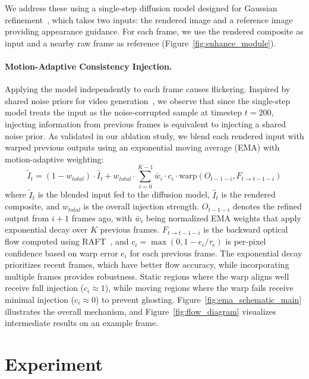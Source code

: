 \documentclass[acmtog]{acmart}
\begin{document}
We address these using a single-step diffusion model designed for Gaussian refinement~\cite{wu2025difix3d+}, which takes two inputs: the rendered image and a reference image providing appearance guidance.
For each frame, we use the rendered composite as input and a nearby raw frame as reference (Figure~\ref{fig:enhance_module}).

\paragraph{Motion-Adaptive Consistency Injection.}
Applying the model independently to each frame causes flickering. Inspired by shared noise priors for video generation~\cite{wang2024microcinema}, we observe that since the single-step model treats the input as the noise-corrupted sample at timestep $t=200$, injecting information from previous frames is equivalent to injecting a shared noise prior. As validated in our ablation study, we blend each rendered input with warped previous outputs using an exponential moving average (EMA) with motion-adaptive weighting:
\begin{equation}
\tilde{I}_t = (1 - w_{total}) \cdot \hat{I}_t + w_{total} \cdot \sum_{i=0}^{K-1} \bar{w}_i \cdot c_i \cdot \text{warp}(O_{t-1-i}, F_{t \rightarrow t-1-i})
\end{equation}
where $\tilde{I}_t$ is the blended input fed to the diffusion model, $\hat{I}_t$ is the rendered composite, and $w_{total}$ is the overall injection strength.
$O_{t-1-i}$ denotes the refined output from $i+1$ frames ago, with $\bar{w}_i$ being normalized EMA weights that apply exponential decay over $K$ previous frames.
$F_{t \rightarrow t-1-i}$ is the backward optical flow computed using RAFT~\cite{teed2020raft}, and $c_i = \max(0, 1 - e_i/\tau_e)$ is per-pixel confidence based on warp error $e_i$ for each previous frame.
The exponential decay prioritizes recent frames, which have better flow accuracy, while incorporating multiple frames provides robustness.
Static regions where the warp aligns well receive full injection ($c_i \approx 1$), while moving regions where the warp fails receive minimal injection ($c_i \approx 0$) to prevent ghosting.
Figure~\ref{fig:ema_schematic_main} illustrates the overall mechanism, and Figure~\ref{fig:flow_diagram} visualizes intermediate results on an example frame.

\section{Experiment}
\end{document}
